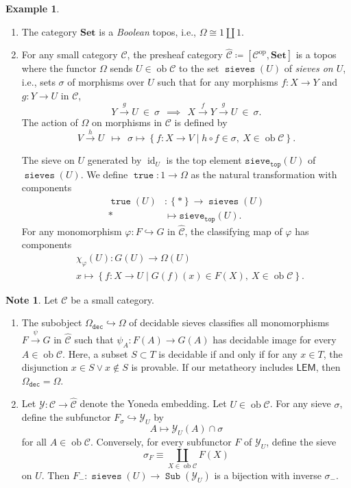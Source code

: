 \documentclass[10pt,letterpaper,cm]{nupset}
\theoremstyle{definition}
\newtheorem{exmp}[definition]{Example}
\newtheorem{note}[definition]{Note}
\theoremstyle{theorem}
\theoremstyle{remark}
\newcommand{\1}{\mathbf{1}}
\renewcommand{\c}{\mathscr{C}}
\newcommand{\y}{\mathcal{Y}}
\newcommand{\0}{\vec 0}
\DeclareMathOperator{\id}{id}
\DeclareMathOperator{\true}{\mathtt{true}}
\DeclareMathOperator{\sieves}{\mathtt{sieves}}
\DeclareMathOperator{\op}{op}
\DeclareMathOperator{\ob}{ob}
\DeclareMathOperator{\sub}{\mathtt{Sub}}
\newcommand{\be}{\begin{enumerate}}
\newcommand{\ee}{\end{enumerate}}
\begin{document}
\pagebreak

\begin{exmp} $ $
\be
\item The category $\mathbf{Set}$ is a \textit{Boolean} topos, i.e., $\Omega \cong 1 \coprod 1$. 
\item For any small category $\c$, the presheaf category $\widehat{\c} \coloneqq \left[ \c^{\op}, \mathbf{Set}\right]$ is a topos where the functor $\Omega$ sends $U \in \ob{\c}$ to the set $\sieves(U)$ of \textit{sieves on $U$}, i.e., sets $\sigma$ of morphisms over $U$ such that for any morphisms $f : X \to Y$ and $g : Y \to U$ in $\c$,
\[
Y \xrightarrow{g} U \  \in \ \sigma \ \ \implies \ \  X \xrightarrow{f} Y \xrightarrow{g} U \ \in \ \sigma 
.\] 
The action of $\Omega$ on morphisms in $\c$ is defined by
\[
V \xrightarrow{h} U  \ \  \mapsto \ \  \sigma \mapsto \left\{f : X \to V \mid h \circ f \in \sigma, \ X \in \ob{\c}    \right\}   
.\]

The sieve on $U$ generated by  $\id_U$ is the top element $\mathtt{sieve}_{\mathtt{top}}(U)$ of $\sieves(U)$. We define $\true : 1 \to \Omega$ as  the natural transformation with components
\begin{align*}
\true(U) & : \left\{\ast\right\} \to \sieves(U)
\\ \ast & \mapsto \mathtt{sieve}_{\mathtt{top}}(U).
\end{align*}
For any monomorphism $\varphi: F \hookrightarrow G$ in $\widehat{\c}$, the classifying map of $\varphi$ has components
\begin{align*}
& \chi_{\varphi}(U)  : G(U) \to \Omega(U)
\\ & x  \mapsto  \left\{f : X \to U \mid G(f)(x) \in  F(X),\ X \in \ob{\c}   \right\}.
\end{align*}
\ee
\end{exmp}

\begin{note} Let $\c$ be a small category.
\be
\item The subobject $\Omega_{\mathtt{dec}} \hookrightarrow \Omega$ of decidable sieves classifies all monomorphisms $F \xrightarrow{\psi} G$ in $\widehat{\c}$ such that $\psi_A : F(A) \to G(A)$ has decidable image for every $A \in \ob{\c}$. Here, a subset $S \subset T$ is decidable if and only if for any $x \in T$, the disjunction $x \in S \vee x \notin S$ is provable. If our metatheory includes $\mathsf{LEM}$, then $\Omega_{\mathtt{dec}} = \Omega$.
\item  Let $\y : \c \to \widehat{\c}$ denote the Yoneda embedding.
Let $U \in \ob{\c}$. For any sieve $\sigma$, define the subfunctor $F_{\sigma} \hookrightarrow \y_{U}$ by 
\[
A  \mapsto  \y_U(A) \cap \sigma
\] for  all $A \in \ob{\c}$. Conversely, for every subfunctor $F$ of $\y_U$, define the sieve 
\[
\sigma_F \equiv \coprod_{X \in \ob{\c}}F(X)
\] on $U$. Then $F_{-} : \sieves(U) \to \sub(\y_U)$ is a bijection with inverse $\sigma_{-}$.
\ee
\end{note}
\end{document}
